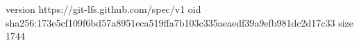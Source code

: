 version https://git-lfs.github.com/spec/v1
oid sha256:173e5cf109f6bd57a8951eca519ffa7b103c335aeaedf39a9efb981dc2d17c33
size 1744
